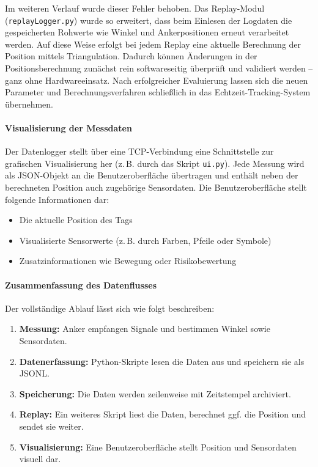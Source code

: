 \documentclass[a4paper, 12pt]{article} %
\begin{document}
Im weiteren Verlauf wurde dieser Fehler behoben. Das Replay-Modul (\texttt{replayLogger.py}) wurde so erweitert, dass beim Einlesen der Logdaten die gespeicherten Rohwerte wie Winkel und Ankerpositionen erneut verarbeitet werden. Auf diese Weise erfolgt bei jedem Replay eine aktuelle Berechnung der Position mittels Triangulation. Dadurch können Änderungen in der Positionsberechnung zunächst rein softwareseitig überprüft und validiert werden – ganz ohne Hardwareeinsatz. Nach erfolgreicher Evaluierung lassen sich die neuen Parameter und Berechnungsverfahren schließlich in das Echtzeit-Tracking-System übernehmen.

\paragraph{Visualisierung der Messdaten}

Der Datenlogger stellt über eine TCP-Verbindung eine Schnittstelle zur grafischen Visualisierung her (z.\,B. durch das Skript \texttt{ui.py}). 
Jede Messung wird als \ac{JSON}-Objekt an die Benutzeroberfläche übertragen und enthält neben der berechneten Position auch zugehörige Sensordaten. 
Die Benutzeroberfläche stellt folgende Informationen dar:

\begin{itemize}
    \item Die aktuelle Position des Tags
    \item Visualisierte Sensorwerte (z.\,B. durch Farben, Pfeile oder Symbole)
    \item Zusatzinformationen wie Bewegung oder Risikobewertung
\end{itemize}

\paragraph{Zusammenfassung des Datenflusses}

Der vollständige Ablauf lässt sich wie folgt beschreiben:

\begin{enumerate}
    \item \textbf{Messung:} Anker empfangen Signale und bestimmen Winkel sowie Sensordaten.
    \item \textbf{Datenerfassung:} Python-Skripte lesen die Daten aus und speichern sie als JSONL.
    \item \textbf{Speicherung:} Die Daten werden zeilenweise mit Zeitstempel archiviert.
    \item \textbf{Replay:} Ein weiteres Skript liest die Daten, berechnet ggf. die Position und sendet sie weiter.
    \item \textbf{Visualisierung:} Eine Benutzeroberfläche stellt Position und Sensordaten visuell dar.
\end{enumerate}
\end{document}
